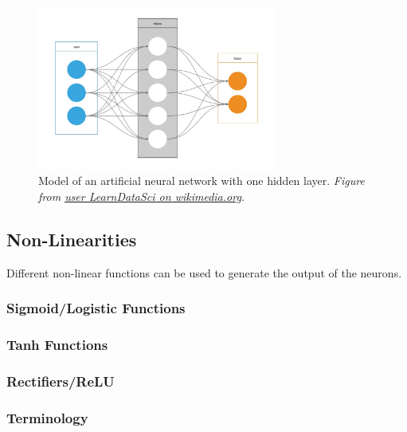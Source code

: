 \documentclass[
]{book}
\begin{document}
\centering

\begin{figure}
\hypertarget{CDF}{%
\centering
\includegraphics[width=0.7\textwidth,height=\textheight]{./figures/Artificial_Neural_Network.jpg}
\caption{Model of an artificial neural network with one hidden layer. \emph{Figure
from \href{https://commons.wikimedia.org/wiki/File:Artificial_Neural_Network.jpg}{user LearnDataSci on
wikimedia.org}.}}\label{CDF}
}
\end{figure}

\hypertarget{non-linearities}{%
\subsection{Non-Linearities}\label{non-linearities}}

Different non-linear functions can be used to generate the output of the
neurons.

\hypertarget{sigmoidlogistic-functions}{%
\subsubsection{Sigmoid/Logistic Functions}\label{sigmoidlogistic-functions}}

\hypertarget{tanh-functions}{%
\subsubsection{Tanh Functions}\label{tanh-functions}}

\hypertarget{rectifiersrelu}{%
\subsubsection{Rectifiers/ReLU}\label{rectifiersrelu}}

\hypertarget{terminology-1}{%
\subsubsection{Terminology}\label{terminology-1}}
\end{document}
